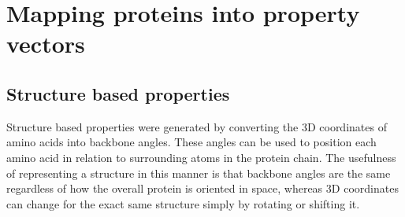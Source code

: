 \section{Mapping proteins into property vectors}
\label{sec:vqfeatures}


\subsection{Structure based properties}

Structure based properties were generated by converting the 3D coordinates of amino acids into backbone angles. These angles can be used to position each amino acid in relation to surrounding atoms in the protein chain.  The usefulness of representing a structure in this manner is that backbone angles are the same regardless of how the overall protein is oriented in space, whereas 3D coordinates can change for the exact same structure simply by rotating or shifting it.  

